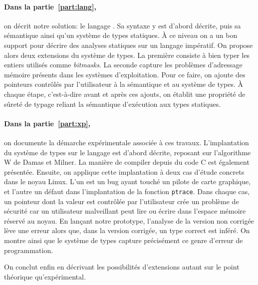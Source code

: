 \paragraph{Dans la partie~\ref{part:lang},} on décrit notre solution: le langage
\langname{}. Sa syntaxe y est d'abord décrite, puis sa sémantique ainsi qu'un
système de types statiques. À ce niveau on a un bon support pour décrire des
analyses statiques sur un langage impératif. On propose alors deux extensions du
système de types. La première consiste à bien typer les entiers utilisés comme
\emph{bitmasks}. La seconde capture les problèmes d'adressage mémoire présents
dans les systèmes d'exploitation. Pour ce faire, on ajoute des pointeurs
contrôlés par l'utilisateur à la sémantique et au système de types. À chaque
étape, c'est-à-dire avant et après ces ajouts, on établit une propriété de
sûreté de typage reliant la sémantique d'exécution aux types statiques.


\paragraph{Dans la partie~\ref{part:xp},} on documente la démarche expérimentale
associée à ces travaux. L'implantation du système de types sur le langage
\newspeak est d'abord décrite, reposant sur l'algorithme W de Damas et Milner.
La manière de compiler depuis du code C est également présentée. Ensuite, on
applique cette implantation à deux cas d'étude concrets dans le noyau Linux.
L'un est un bug ayant touché un pilote de carte graphique, et l'autre un défaut
dans l'implantation de la fonction \texttt{ptrace}. Dans chaque cas, un pointeur
dont la valeur est contrôlée par l'utilisateur crée un problème de sécurité car
un utilisateur malveillant peut lire ou écrire dans l'espace mémoire réservé au
noyau. En lançant notre prototype, l'analyse de la version non corrigée lève une
erreur alors que, dans la version corrigée, un type correct est inféré. On
montre ainsi que le système de types capture précisément ce genre d'erreur de
programmation.

On conclut enfin en décrivant les possibilités d'extensions autant sur le point
théorique qu'expérimental.

